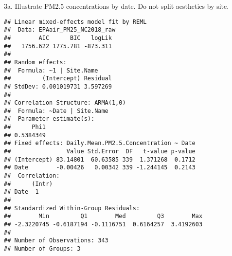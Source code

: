 \documentclass[]{article}
\newenvironment{Shaded}{\begin{snugshade}}{\end{snugshade}}
\newcommand{\KeywordTok}[1]{\textcolor[rgb]{0.13,0.29,0.53}{\textbf{#1}}}
\newcommand{\DataTypeTok}[1]{\textcolor[rgb]{0.13,0.29,0.53}{#1}}
\newcommand{\DecValTok}[1]{\textcolor[rgb]{0.00,0.00,0.81}{#1}}
\newcommand{\FloatTok}[1]{\textcolor[rgb]{0.00,0.00,0.81}{#1}}
\newcommand{\StringTok}[1]{\textcolor[rgb]{0.31,0.60,0.02}{#1}}
\newcommand{\CommentTok}[1]{\textcolor[rgb]{0.56,0.35,0.01}{\textit{#1}}}
\newcommand{\OperatorTok}[1]{\textcolor[rgb]{0.81,0.36,0.00}{\textbf{#1}}}
\newcommand{\NormalTok}[1]{#1}
\begin{document}
3a. Illustrate PM2.5 concentrations by date. Do not split aesthetics by
site.

\begin{Shaded}
\end{Shaded}

\begin{verbatim}
## Linear mixed-effects model fit by REML
##  Data: EPAair_PM25_NC2018_raw 
##        AIC      BIC   logLik
##   1756.622 1775.781 -873.311
## 
## Random effects:
##  Formula: ~1 | Site.Name
##         (Intercept) Residual
## StdDev: 0.001019731 3.597269
## 
## Correlation Structure: ARMA(1,0)
##  Formula: ~Date | Site.Name 
##  Parameter estimate(s):
##      Phi1 
## 0.5384349 
## Fixed effects: Daily.Mean.PM2.5.Concentration ~ Date 
##                Value Std.Error  DF   t-value p-value
## (Intercept) 83.14801  60.63585 339  1.371268  0.1712
## Date        -0.00426   0.00342 339 -1.244145  0.2143
##  Correlation: 
##      (Intr)
## Date -1    
## 
## Standardized Within-Group Residuals:
##        Min         Q1        Med         Q3        Max 
## -2.3220745 -0.6187194 -0.1116751  0.6164257  3.4192603 
## 
## Number of Observations: 343
## Number of Groups: 3
\end{verbatim}
\end{document}
